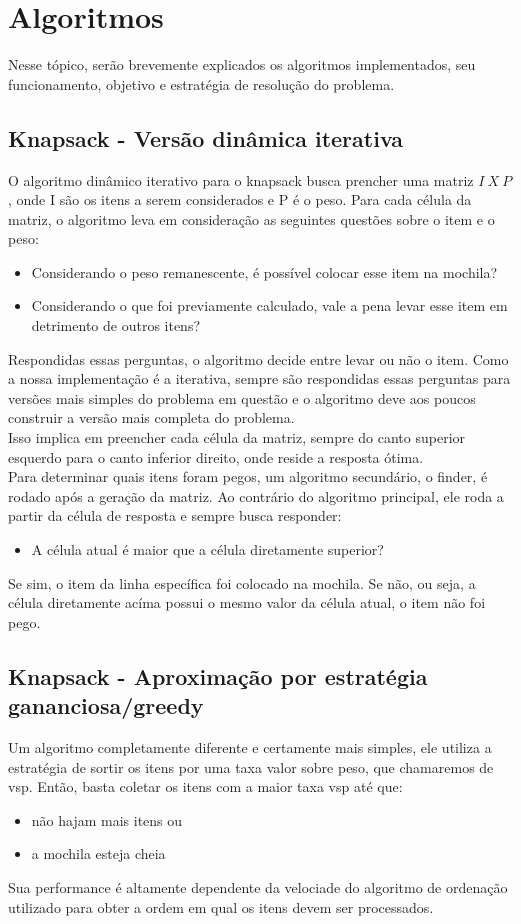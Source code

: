 \documentclass{article}
\begin{document}
\section{Algoritmos}\label{algoritmos}
Nesse tópico, serão brevemente explicados os algoritmos implementados, seu funcionamento, objetivo e estratégia de resolução do problema.

\subsection{Knapsack - Versão dinâmica iterativa}
O algoritmo dinâmico iterativo para o knapsack busca prencher uma matriz $I\ X\ P$, onde I são os itens a serem considerados e P é o peso. Para cada célula da matriz, o algoritmo leva em consideração as seguintes questões sobre o item e o peso:
\begin{itemize}
    \item Considerando o peso remanescente, é possível colocar esse item na mochila?
    \item Considerando o que foi previamente calculado, vale a pena levar esse item em detrimento de outros itens?
\end{itemize}
Respondidas essas perguntas, o algoritmo decide entre levar ou não o item. Como a nossa implementação é a iterativa, sempre são respondidas essas perguntas para versões mais simples do problema em questão e o algoritmo deve aos poucos construir a versão mais completa do problema.\\
Isso implica em preencher cada célula da matriz, sempre do canto superior esquerdo para o canto inferior direito, onde reside a resposta ótima.\\
Para determinar quais itens foram pegos, um algoritmo secundário, o finder, é rodado após a geração da matriz. Ao contrário do algoritmo principal, ele roda a partir da célula de resposta e sempre busca responder:
\begin{itemize}
    \item A célula atual é maior que a célula diretamente superior?
\end{itemize}
Se sim, o item da linha específica foi colocado na mochila. Se não, ou seja, a célula diretamente acíma possui o mesmo valor da célula atual, o item não foi pego.

\subsection{Knapsack - Aproximação por estratégia gananciosa/greedy}
Um algoritmo completamente diferente e certamente mais simples, ele utiliza a estratégia de sortir os itens por uma taxa valor sobre peso, que chamaremos de vsp. Então, basta coletar os itens com a maior taxa vsp até que:
\begin{itemize}
    \item não hajam mais itens ou
    \item a mochila esteja cheia
\end{itemize}
Sua performance é altamente dependente da velociade do algoritmo de ordenação utilizado para obter a ordem em qual os itens devem ser processados. 
\end{document}

